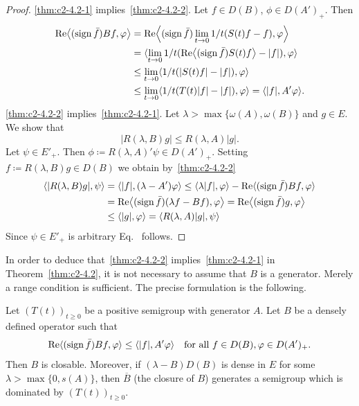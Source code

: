 \begin{proof}
\ref{thm:c2-4.2-1}   implies~\ref{thm:c2-4.2-2}. Let $f \in D(B)$, $\phi \in D(A')_{+}$. Then
\begin{align*}
\Re\mleft\langle(\sign  \bar{f})Bf, \phi\mright\rangle &= 
\Re \mleft\langle(\sign  \bar{f})\lim_{t \to 0}1/t(S(t)f - f),\phi\mright\rangle\\
&= \langle\lim_{t \to 0}1/t(\Re\mleft\langle(\sign  \bar{f}) S(t)f\mright\rangle - |f|),\phi\rangle\\
&\leq \lim_{t \to 0}\langle 1/t(|S(t)f| - |f|),\phi\rangle\\
&\leq \lim_{t \to 0}\langle 1/t(T(t)|f| - |f|),\phi\rangle = \langle|f|,A'\phi\rangle.
\end{align*}
\ref{thm:c2-4.2-2}   implies~\ref{thm:c2-4.2-1}. 
Let $\lambda > \max\{\omega (A),\omega (B)\}$ and $g \in E$. 
We show that
\begin{equation}\label{eq:c2-4.3}
|R(\lambda,B)g| \leq R(\lambda,A)|g|.
\end{equation}
Let $\psi \in E'_{+}$. Then $\phi \coloneq R(\lambda,A)'\psi \in D(A')_{+}$.
Setting $f \coloneq R(\lambda,B)g \in D(B)$ we obtain by~\ref{thm:c2-4.2-2}  
\begin{align*}
\langle|R(\lambda,B)g|,\psi\rangle &= \langle|f|,(\lambda-A')\phi\rangle \leq \langle\lambda|f|,\phi\rangle - \Re\langle(\sign  \bar{f})Bf,\phi\rangle\\
&= \Re\mleft\langle(\sign  \bar{f})(\lambda f - Bf),\phi\mright\rangle 
= \Re\mleft\langle(\sign  \bar{f})g,\phi\mright\rangle \\
&\leq \mleft\langle|g|,\phi\mright\rangle = \langle R(\lambda,A)|g|,\psi\rangle
\end{align*}
Since $\psi \in E'_{+}$ is arbitrary Eq.~ follows.
\end{proof}
In order to deduce that~\ref{thm:c2-4.2-2}   implies~\ref{thm:c2-4.2-1}   in Theorem~\ref{thm:c2-4.2}, it is not
necessary to assume that $B$ is a generator. 
Merely a range condition is sufficient. 
The precise formulation is the following.
\begin{theorem}\label{thm:c2-4.3}
Let $(T(t))_{t \geq 0}$ be a positive semigroup with generator $A$. 
Let $B$ be a densely defined operator such that
\begin{equation}\label{eq:c2-4.4}
\Re\langle(\sign  \bar{f})Bf,\phi\rangle \leq \langle|f|,A'\phi\rangle
\quad\text{for all } f \in D(B), \phi \in D(A')_{+} .
\end{equation}
Then $B$ is closable. 
Moreover, if\/ $(\lambda - B)D(B)$ is dense in $E$ for some $\lambda > \max\{0,s(A)\}$, then $\overline{B}$ (the closure of\/ $B$) generates a
semigroup which is dominated by $(T(t))_{t \geq 0}$.
\end{theorem}
